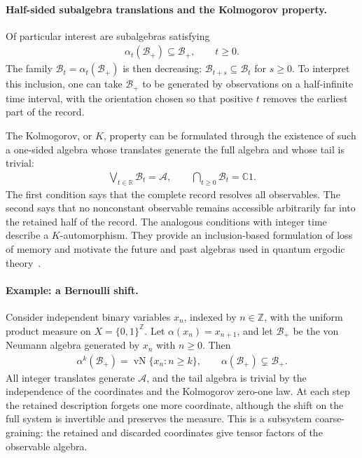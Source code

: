 \documentclass[a4paper,11pt]{article}
\theoremstyle{definition}
\theoremstyle{remark}
\newcommand{\mA}{\mathcal{A}}
\newcommand{\mB}{\mathcal{B}}
\begin{document}
\paragraph{Half-sided subalgebra translations and the Kolmogorov property.}
Of particular interest are subalgebras satisfying
\begin{align}\label{eq:classical-one-sided-inclusion}
    \alpha_t(\mB_+)\subseteq\mB_+,\qquad t\geq0.
\end{align}
The family $\mB_t=\alpha_t(\mB_+)$ is then decreasing: $\mB_{t+s}\subseteq\mB_t$ for
$s\geq0$.  To interpret this inclusion, one can take $\mB_+$ to be generated by
observations on a half-infinite time interval, with the orientation chosen so that
positive $t$ removes the earliest part of the record.
 
The Kolmogorov, or $K$, property can be formulated through the existence of such a
one-sided algebra whose translates generate the full algebra and whose tail is trivial:
\begin{align}\label{eq:classical-K-algebra}
    \bigvee_{t\in\mathbb{R}}\mB_t=\mA,\qquad
    \bigcap_{t\geq0}\mB_t=\mathbb{C}1.
\end{align}
The first condition says that the complete record resolves all observables.  The second
says that no nonconstant observable remains accessible arbitrarily far into the retained
half of the record.  The analogous conditions with integer time describe a
$K$-automorphism.  They provide an inclusion-based formulation of loss of memory and
motivate the future and past algebras used in quantum ergodic theory~\cite{ouseph2024local}.
 
\paragraph{Example: a Bernoulli shift.}
Consider independent binary variables $x_n$, indexed by $n\in\mathbb{Z}$, with the
uniform product measure on $X=\{0,1\}^{\mathbb{Z}}$.  Let $\alpha(x_n)=x_{n+1}$, and
let $\mB_+$ be the von Neumann algebra generated by $x_n$ with $n\geq0$.  Then
\begin{align}
    \alpha^k(\mB_+)=\operatorname{vN}\{x_n:n\geq k\},\qquad
    \alpha(\mB_+)\subsetneq\mB_+.
\end{align}
All integer translates generate $\mA$, and the tail algebra is trivial by the
independence of the coordinates and the Kolmogorov zero-one law.  At each step the
retained description forgets one more coordinate, although the shift on the full system
is invertible and preserves the measure.  This is a subsystem coarse-graining: the
retained and discarded coordinates give tensor factors of the observable algebra.
 
\end{document}
